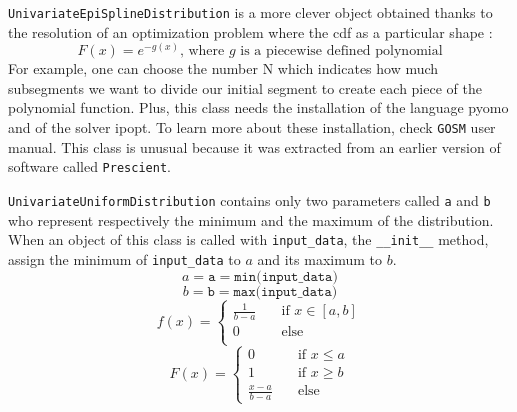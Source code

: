 \documentclass{article}
\begin{document}
	 \texttt{UnivariateEpiSplineDistribution} is a more clever object obtained thanks to the resolution of an optimization problem where the cdf as a particular shape : \newline
	 \begin{equation*}
  	F(x) = e^{-g(x)}\text{, where }g\text{ is a piecewise defined polynomial}
  	\end{equation*}
  	 For example, one can choose the number N which indicates how much subsegments we want to divide our initial segment to create each piece of the polynomial function. Plus, this class needs the installation of the language pyomo and of the solver ipopt. To learn more about these installation, check \texttt{GOSM} user manual. This class is unusual because it was extracted from an earlier version of software called \texttt{Prescient}.\newline


	 \texttt{UnivariateUniformDistribution} contains only two parameters called \texttt{a} and \texttt{b} who represent respectively the minimum and the maximum of the distribution. When an object of this class is called with \texttt{input\_data}, the \texttt{\_\_init\_\_} method, assign the minimum of \texttt{input\_data} to $a$ and its maximum to $b$.
	 \begin{equation*}
	 a = \texttt{a} = \texttt{min(input\_data)}
	 \end{equation*}
	 \begin{equation*}
	 b = \texttt{b}= \texttt{max(input\_data)}
	 \end{equation*}
	 \[
   		f(x) =
   		\begin{cases}

    	\frac{1}{b-a} & \quad \text{if } x \in [a,b]\\
    	0  & \quad \text{else}\\
  \end{cases}
  \]
	 \[
   		F(x) =
   		\begin{cases}
        0  & \quad \text{if } x \leq a \\
    	1 & \quad \text{if } x \geq b \\
    	\frac{x-a}{b-a} & \quad \text{else}
  \end{cases}
  \]
\end{document}
